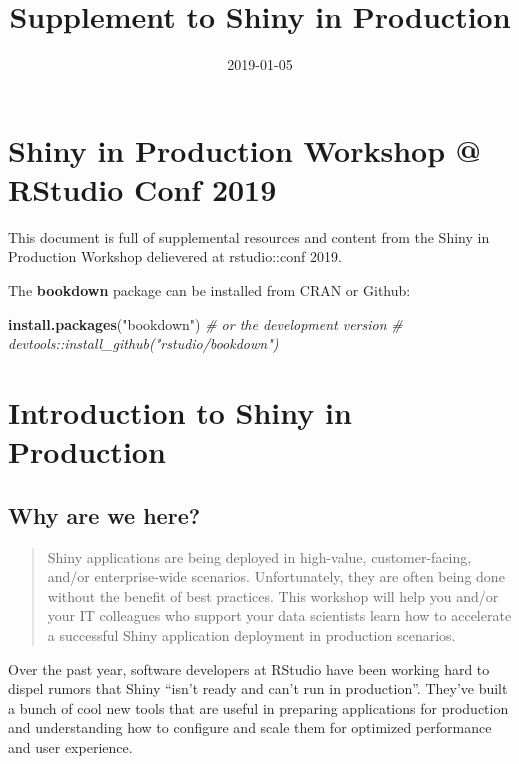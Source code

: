 \documentclass[]{book}
\title{Supplement to Shiny in Production}
\author{}
\date{2019-01-05}
\newenvironment{Shaded}{\begin{snugshade}}{\end{snugshade}}
\newcommand{\CommentTok}[1]{\textcolor[rgb]{0.56,0.35,0.01}{\textit{#1}}}
\newcommand{\KeywordTok}[1]{\textcolor[rgb]{0.13,0.29,0.53}{\textbf{#1}}}
\newcommand{\NormalTok}[1]{#1}
\newcommand{\StringTok}[1]{\textcolor[rgb]{0.31,0.60,0.02}{#1}}
\theoremstyle{definition}
\theoremstyle{definition}
\theoremstyle{definition}
\theoremstyle{remark}
\begin{document}
\maketitle

{
\setcounter{tocdepth}{1}
\tableofcontents
}
\hypertarget{shiny-in-production-workshop-rstudio-conf-2019}{%
\chapter{Shiny in Production Workshop @ RStudio Conf
2019}\label{shiny-in-production-workshop-rstudio-conf-2019}}

This document is full of supplemental resources and content from the
Shiny in Production Workshop delievered at rstudio::conf 2019.

The \textbf{bookdown} package can be installed from CRAN or Github:

\begin{Shaded}
\begin{Highlighting}[]
\KeywordTok{install.packages}\NormalTok{(}\StringTok{"bookdown"}\NormalTok{)}
\CommentTok{# or the development version}
\CommentTok{# devtools::install_github("rstudio/bookdown")}
\end{Highlighting}
\end{Shaded}

\hypertarget{course-intro}{%
\chapter{Introduction to Shiny in Production}\label{course-intro}}

\hypertarget{why-are-we-here}{%
\section{Why are we here?}\label{why-are-we-here}}

\begin{quote}
Shiny applications are being deployed in high-value, customer-facing,
and/or enterprise-wide scenarios. Unfortunately, they are often being
done without the benefit of best practices. This workshop will help you
and/or your IT colleagues who support your data scientists learn how to
accelerate a successful Shiny application deployment in production
scenarios.
\end{quote}

Over the past year, software developers at RStudio have been working
hard to dispel rumors that Shiny ``isn't ready and can't run in
production''. They've built a bunch of cool new tools that are useful in
preparing applications for production and understanding how to configure
and scale them for optimized performance and user experience.
\end{document}
